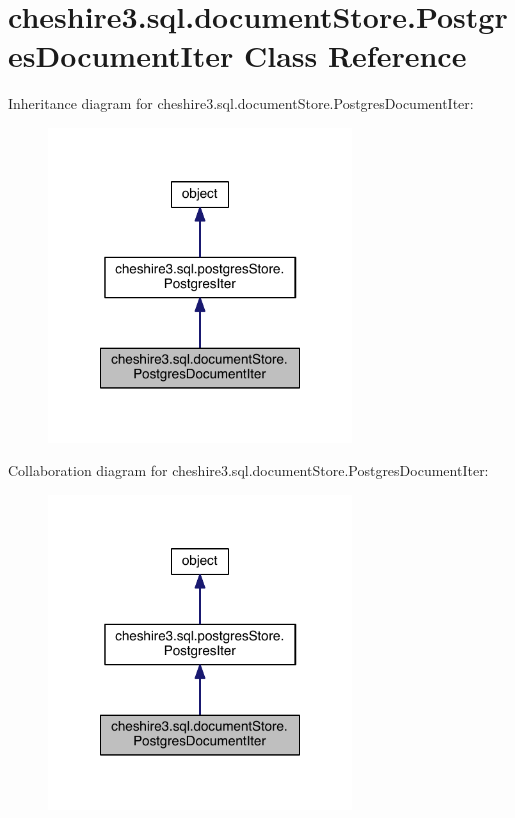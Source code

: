 \hypertarget{classcheshire3_1_1sql_1_1document_store_1_1_postgres_document_iter}{\section{cheshire3.\-sql.\-document\-Store.\-Postgres\-Document\-Iter Class Reference}
\label{classcheshire3_1_1sql_1_1document_store_1_1_postgres_document_iter}
}


Inheritance diagram for cheshire3.\-sql.\-document\-Store.\-Postgres\-Document\-Iter\-:
\nopagebreak
\begin{figure}[H]
\begin{center}
\leavevmode
\includegraphics[width=228pt]{classcheshire3_1_1sql_1_1document_store_1_1_postgres_document_iter__inherit__graph}
\end{center}
\end{figure}


Collaboration diagram for cheshire3.\-sql.\-document\-Store.\-Postgres\-Document\-Iter\-:
\nopagebreak
\begin{figure}[H]
\begin{center}
\leavevmode
\includegraphics[width=228pt]{classcheshire3_1_1sql_1_1document_store_1_1_postgres_document_iter__coll__graph}
\end{center}
\end{figure}
